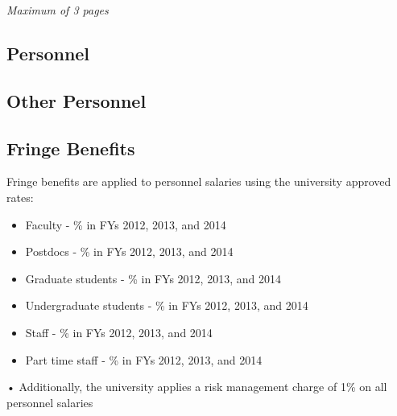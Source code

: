 
\renewcommand{\thepage}{f. Budget Justification - Page \arabic{page} of 1}

\begin{center}
\emph{Maximum of 3 pages}
\end{center}

\subsection*{Personnel}


\subsection*{Other Personnel}

\subsection*{Fringe Benefits}
Fringe benefits are applied to personnel salaries using the university approved rates:
\begin{itemize}
\item Faculty - \% in FYs 2012, 2013, and 2014
\item Postdocs - \% in FYs 2012, 2013, and 2014
\item Graduate students - \% in FYs 2012, 2013, and 2014
\item Undergraduate students - \% in FYs 2012, 2013, and 2014
\item Staff - \% in FYs 2012, 2013, and 2014
\item Part time staff - \% in FYs 2012, 2013, and 2014
\end{itemize}•
Additionally, the university applies a risk management charge of 1\% on all personnel
salaries

